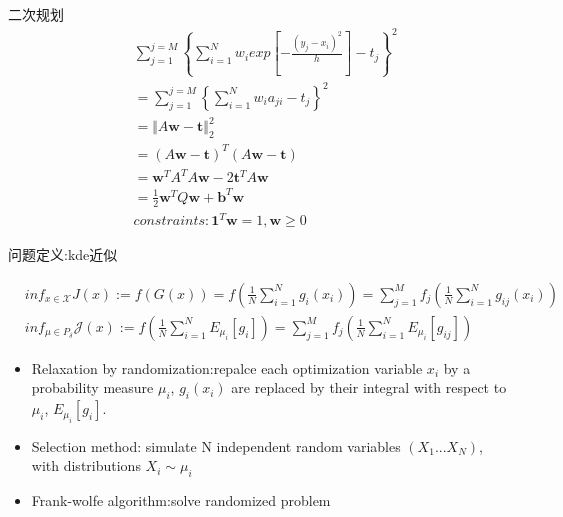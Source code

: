 \documentclass{beamer}
\begin{document}
\begin{frame}{二次规划}
	\begin{align}
	 &\sum_{j=1}^{j=M}\left\{\sum_{i=1}^{N}w_iexp\left[-\frac{(y_j-x_i)^2}{h}\right]-t_j\right\}^2 \nonumber \\
	 &=  \sum_{j=1}^{j=M}\left\{\sum_{i=1}^{N}w_ia_{ji}-t_j\right\}^2 \nonumber\\
	 & =  \Vert A\mathbf{w}-\mathbf{t} \Vert_2^2  \nonumber \\
	 & = (A\mathbf{w}-\mathbf{t} )^T(A\mathbf{w}-\mathbf{t} ) \nonumber \\
	 & = \mathbf{w}^TA^T A\mathbf{w}-2\mathbf{t}^TA\mathbf{w}  \nonumber\\
	 & = \frac{1}{2}\mathbf{w}^TQ\mathbf{w}+\mathbf{b}^T\mathbf{w}  \nonumber \\
	 &constraints:\mathbf{1}^T\mathbf{w}=1 , \mathbf{w} \ge 0 \nonumber
	\end{align}
\end{frame}


\begin{frame}{问题定义:kde近似}

\begin{align}
	& inf_{x\in \mathcal{X}} J(x):=f(G(x))=f(\frac{1}{N}\sum_{i=1}^{N}g_i(x_i))=\sum_{j=1}^{M}f_j(\frac{1}{N}\sum_{i=1}^{N}g_{ij}(x_i)) \nonumber \\
		&inf_{\mu \in P_{\delta}} \mathcal{J}(x):=f(\frac{1}{N}\sum_{i=1}^{N}E_{\mu_i}\left[g_i\right])=\sum_{j=1}^{M}f_j(\frac{1}{N}\sum_{i=1}^{N}E_{\mu_i}\left[g_{ij}\right]) \nonumber 
\end{align}
\begin{itemize}
	\item Relaxation by randomization:repalce each optimization variable $x_i$ by a probability measure $\mu_i$, $g_i(x_i)$ are replaced by their integral with respect to $\mu_i$, $E_{\mu_i}\left[g_i\right]$.
	\item Selection method: simulate N
	independent random variables $(X_1 ...  X_N )$, with distributions $X_i \sim \mu_i$
	\item Frank-wolfe algorithm:solve randomized problem
\end{itemize}
\end{frame}
\end{document}
